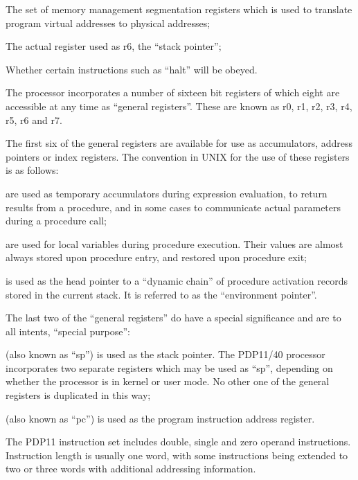 \bi
\item The set of memory management segmentation
registers which is used
to translate program virtual
addresses to physical addresses;

\item The actual register used as r6, the
``stack pointer'';

\item Whether certain instructions such as
``halt'' will be obeyed.
\ei


The processor incorporates a number of
sixteen bit registers of which eight
are accessible at any time as ``general
registers''. These are known as
r0, r1, r2, r3, r4, r5, r6 and r7.

The first six of the general registers
are available for use as accumulators,
address pointers or index registers.
The convention in UNIX for the use of
these registers is as follows:

\bd
\item[r0, r1] are used as temporary accumulators
during expression evaluation, to return results from a
procedure, and in some cases to
communicate actual parameters during a procedure call;

\item[r2, r3, r4] are used for local
variables during procedure execution.
Their values are almost
always stored upon procedure
entry, and restored upon procedure
exit;

\item[r5] is used as the head pointer to
a ``dynamic chain'' of procedure
activation records stored in the
current stack. It is referred to
as the ``environment pointer''.
\ed

The last two of the ``general registers''
do have a special significance and are
to all intents, ``special purpose'':

\bd
\item[r6] (also known as ``sp'') is used as
the stack pointer. The PDP11/40
processor incorporates two
separate registers which may be
used as ``sp'', depending on whether
the processor is in kernel or user
mode. No other one of the general
registers is duplicated in this
way;

\item[r7] (also known as ``pc'') is used as
the program  instruction address register.
\ed


The PDP11 instruction set includes double,
single and zero operand instructions.
Instruction length is usually
one word, with some instructions being
extended to two or three words with
additional addressing information.

